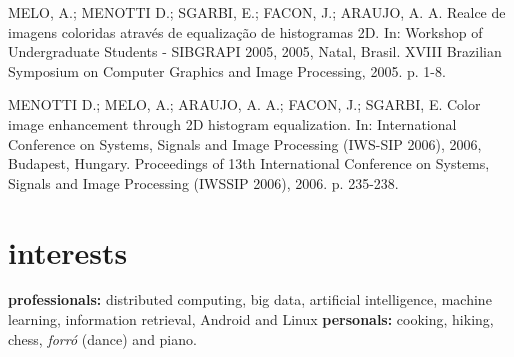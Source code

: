 \documentclass[]{friggeri-cv}
\begin{document}
MELO, A.; MENOTTI D.; SGARBI, E.; FACON, J.; ARAUJO, A. A. Realce de imagens coloridas através de equalização de histogramas 2D. In: Workshop of Undergraduate Students - SIBGRAPI 2005, 2005, Natal, Brasil. XVIII Brazilian Symposium on Computer Graphics and Image Processing, 2005. p. 1-8.

MENOTTI D.; MELO, A.; ARAUJO, A. A.; FACON, J.; SGARBI, E. Color image enhancement through 2D histogram equalization. In: International Conference on Systems, Signals and Image Processing (IWS-SIP 2006), 2006, Budapest, Hungary. Proceedings of 13th International Conference on Systems, Signals and Image Processing (IWSSIP 2006), 2006. p. 235-238.

\section{interests}

\textbf{professionals:} distributed computing, big data, artificial intelligence, machine learning, information retrieval, Android and Linux \textbf{personals:} cooking, hiking,  chess, \textit{forró} (dance) and piano.
\end{document}
